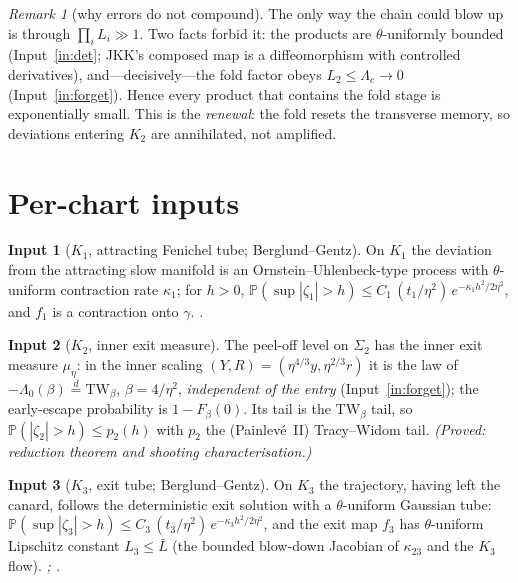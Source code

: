 \documentclass[11pt]{article}
\theoremstyle{definition}
\newtheorem{hyp}{Input}
\theoremstyle{remark}
\newtheorem*{remark}{Remark}
\newcommand{\TW}{\mathrm{TW}}
\newcommand{\Pp}{\mathbb P}
\begin{document}
\begin{remark}[why errors do not compound]
The only way the chain could blow up is through $\prod_i L_i\gg1$. Two facts forbid it:
the products are $\theta$-uniformly bounded (Input~\ref{in:det}; JKK's composed map is a
diffeomorphism with controlled derivatives), and---decisively---the fold factor obeys
$L_2\le\Lambda_c\to0$ (Input~\ref{in:forget}). Hence every product that contains the fold
stage is exponentially small. This is the \emph{renewal}: the fold resets the transverse
memory, so deviations entering $K_2$ are annihilated, not amplified.
\end{remark}

\section{Per-chart inputs}

\begin{hyp}[$K_1$, attracting Fenichel tube; Berglund--Gentz]\label{in:K1}
On $K_1$ the deviation from the attracting slow manifold is an Ornstein--Uhlenbeck-type
process with $\theta$-uniform contraction rate $\kappa_1$; for $h>0$,
$\Pp(\sup|\zeta_1|>h)\le C_1\,(t_1/\eta^2)\,e^{-\kappa_1 h^2/2\eta^2}$, and $f_1$ is a
contraction onto $\gamma$. \emph{\cite[Ch.~5]{BG}.}
\end{hyp}

\begin{hyp}[$K_2$, inner exit measure]\label{in:K2}
The peel-off level on $\Sigma_2$ has the inner exit measure $\mu_\eta$: in the inner
scaling $(Y,R)=(\eta^{4/3}y,\eta^{2/3}r)$ it is the law of $-\Lambda_0(\beta)\stackrel{d}{=}
\TW_\beta$, $\beta=4/\eta^2$, \emph{independent of the entry} (Input~\ref{in:forget});
the early-escape probability is $1-F_\beta(0)$. Its tail is the $\TW_\beta$ tail, so
$\Pp(|\zeta_2|>h)\le p_2(h)$ with $p_2$ the (Painlev\'e~II) Tracy--Widom tail.
\emph{(Proved: reduction theorem and shooting characterisation.)}
\end{hyp}

\begin{hyp}[$K_3$, exit tube; Berglund--Gentz]\label{in:K3}
On $K_3$ the trajectory, having left the canard, follows the deterministic exit solution
with a $\theta$-uniform Gaussian tube: $\Pp(\sup|\zeta_3|>h)\le
C_3\,(t_3/\eta^2)\,e^{-\kappa_3 h^2/2\eta^2}$, and the exit map $f_3$ has $\theta$-uniform
Lipschitz constant $L_3\le\bar L$ (the bounded blow-down Jacobian of $\kappa_{23}$ and the
$K_3$ flow). \emph{\cite[Ch.~5]{BG}; \cite{BGK}.}
\end{hyp}
\end{document}
